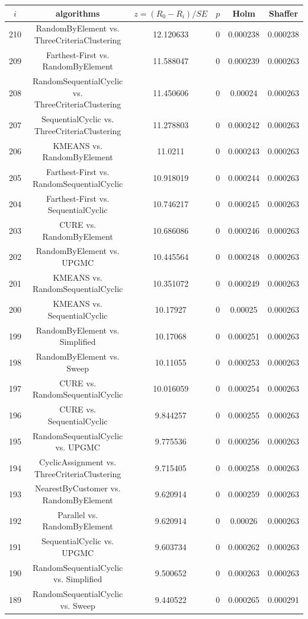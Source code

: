 \documentclass[a4paper,10pt]{article}
\begin{document}
\begin{landscape}
\begin{table}[!htp]
\centering\scriptsize
\begin{tabular}{cccccc}
$i$&algorithms&$z=(R_0 - R_i)/SE$&$p$&Holm&Shaffer\\
\hline210&RandomByElement vs. ThreeCriteriaClustering&12.120633&0&0.000238&0.000238\\
209&Farthest-First vs. RandomByElement&11.588047&0&0.000239&0.000263\\
208&RandomSequentialCyclic vs. ThreeCriteriaClustering&11.450606&0&0.00024&0.000263\\
207&SequentialCyclic vs. ThreeCriteriaClustering&11.278803&0&0.000242&0.000263\\
206&KMEANS vs. RandomByElement&11.0211&0&0.000243&0.000263\\
205&Farthest-First vs. RandomSequentialCyclic&10.918019&0&0.000244&0.000263\\
204&Farthest-First vs. SequentialCyclic&10.746217&0&0.000245&0.000263\\
203&CURE vs. RandomByElement&10.686086&0&0.000246&0.000263\\
202&RandomByElement vs. UPGMC&10.445564&0&0.000248&0.000263\\
201&KMEANS vs. RandomSequentialCyclic&10.351072&0&0.000249&0.000263\\
200&KMEANS vs. SequentialCyclic&10.17927&0&0.00025&0.000263\\
199&RandomByElement vs. Simplified&10.17068&0&0.000251&0.000263\\
198&RandomByElement vs. Sweep&10.11055&0&0.000253&0.000263\\
197&CURE vs. RandomSequentialCyclic&10.016059&0&0.000254&0.000263\\
196&CURE vs. SequentialCyclic&9.844257&0&0.000255&0.000263\\
195&RandomSequentialCyclic vs. UPGMC&9.775536&0&0.000256&0.000263\\
194&CyclicAssignment vs. ThreeCriteriaClustering&9.715405&0&0.000258&0.000263\\
193&NearestByCustomer vs. RandomByElement&9.620914&0&0.000259&0.000263\\
192&Parallel vs. RandomByElement&9.620914&0&0.00026&0.000263\\
191&SequentialCyclic vs. UPGMC&9.603734&0&0.000262&0.000263\\
190&RandomSequentialCyclic vs. Simplified&9.500652&0&0.000263&0.000263\\
189&RandomSequentialCyclic vs. Sweep&9.440522&0&0.000265&0.000291\\

\end{tabular}
\end{table}
\end{landscape}
\end{document}
